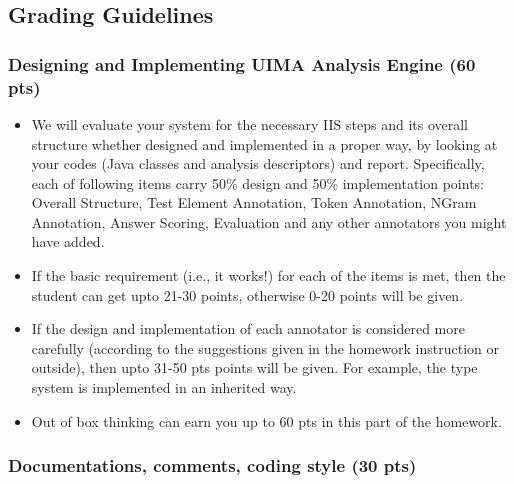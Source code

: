 
\subsection{Grading Guidelines}

\subsubsection{Designing and Implementing UIMA Analysis Engine (60 pts)}

\begin{itemize}

\item We will evaluate your system for the necessary IIS steps and its overall structure whether designed and implemented in a proper way, by looking at your
codes (Java classes and analysis descriptors) and report. 
Specifically, each of following items carry 50\% design and 50\% implementation points: 
Overall Structure, Test Element Annotation, Token Annotation, NGram Annotation, Answer Scoring, Evaluation and any other annotators you might have added.

\item If the basic requirement (i.e., it works!) for each of the items is met,
then the student can get upto 21-30 points, otherwise 0-20 points will be given.

\item If the design and implementation of each annotator is considered more carefully (according to the suggestions given in the homework instruction or outside), then upto 31-50 pts points will be given. For example, the type system is implemented in an inherited way.

\item Out of box thinking can earn you up to 60 pts in this part of the homework.

\end{itemize}

\subsubsection{Documentations, comments, coding style (30 pts)}

